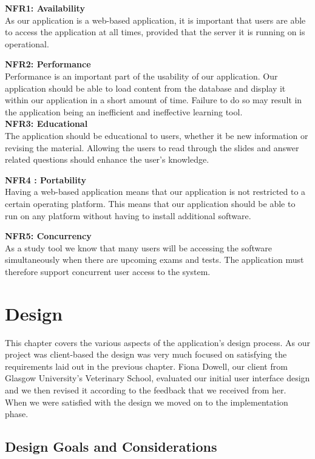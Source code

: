 \documentclass{l3proj}
\begin{document}
\textbf{ NFR1: Availability}\\
As our application is a web-based application, it is important that users are able to access the application at all times, provided that the server it is running on is operational.

\textbf{NFR2: Performance}\\
Performance is an important part of the usability of our application. Our application should be able to load content from the database and display it within our application in a short amount of time. Failure to do so may result in the application being an inefficient and ineffective learning tool.\\

\textbf{ NFR3: Educational}\\
The application should be educational to users, whether it be new information or revising the material. Allowing the users to read through the slides and answer related questions should enhance the user's knowledge.

\textbf{ NFR4 : Portability}\\
Having a web-based application means that our application is not restricted to a certain operating platform. This means that our application should be able to run on any platform without having to install additional software.

\textbf{ NFR5: Concurrency}\\
As a study tool we know that many users will be accessing the software simultaneously when there are upcoming exams and tests. The application must therefore support concurrent user access to the system.

\chapter{Design}
\label{design}

This chapter covers the various aspects of the application's design process. As our project was client-based the design was very much focused on satisfying the requirements laid out in the previous chapter. Fiona Dowell, our client from Glasgow University's Veterinary School, evaluated our initial user interface design and we then revised it according to the feedback that we received from her. When we were satisfied with the design we moved on to the implementation phase.

\newpage

\section{Design Goals and Considerations}
\end{document}
